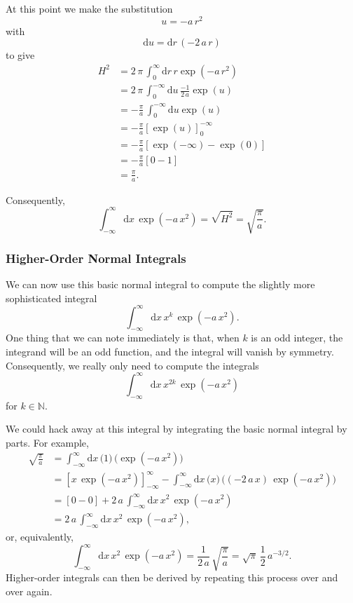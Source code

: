 \documentclass[
  letterpaper,
  DIV=11,
  numbers=noendperiod]{scrartcl}
\begin{document}
At this point we make the substitution \[
u = - a \, r^{2}
\] with \[
\mathrm{d} u = \mathrm{d} r \, (- 2 \, a \, r )
\] to give \begin{align*}
H^{2}
&=
2 \, \pi \, \int_{0}^{\infty} \mathrm{d} r \, r
\exp \left( -a \, r^{2} \right)
\\
&=
2 \, \pi \, \int_{0}^{-\infty} \mathrm{d} u \, \frac{-1}{2 \, a}
\exp \left( u \right)
\\
&=
- \frac{\pi}{a} \, \int_{0}^{-\infty} \mathrm{d} u \exp \left( u \right)
\\
&=
- \frac{\pi}{a} \left[ \exp \left( u \right) \right]_{0}^{-\infty}
\\
&=
- \frac{\pi}{a} \left[ \exp \left( -\infty \right) - \exp \left( 0 \right) \right]
\\
&=
- \frac{\pi}{a} \left[ 0 - 1 \right]
\\
&=
\frac{\pi}{a}.
\end{align*}

Consequently, \[
\int_{-\infty}^{\infty} \mathrm{d} x \,
\exp \left( -a \, x^{2} \right)
=
\sqrt{H^{2}}
=
\sqrt{ \frac{\pi}{a} }.
\]

\subsubsection{Higher-Order Normal
Integrals}\label{higher-order-normal-integrals}

We can now use this basic normal integral to compute the slightly more
sophisticated integral \[
\int_{-\infty}^{\infty} \mathrm{d} x \,
x^{k} \, \exp \left( -a \, x^{2} \right).
\] One thing that we can note immediately is that, when \(k\) is an odd
integer, the integrand will be an odd function, and the integral will
vanish by symmetry. Consequently, we really only need to compute the
integrals \[
\int_{-\infty}^{\infty} \mathrm{d} x \,
x^{2 k} \, \exp \left( -a \, x^{2} \right)
\] for \(k \in \mathbb{N}\).

We could hack away at this integral by integrating the basic normal
integral by parts. For example, \begin{align*}
\sqrt{ \frac{\pi}{a} }
&=
\int_{-\infty}^{\infty} \mathrm{d} x \,
\big( 1 \big) \,
\big( \exp \left( -a \, x^{2} \right) \big)
\\
&=
\left[
  x \, \exp \left( -a \, x^{2} \right)
\right]_{-\infty}^{\infty}
- \int_{-\infty}^{\infty} \mathrm{d} x \,
\big( x \big) \,
\big( (- 2 \, a \, x) \, \exp \left( -a \, x^{2} \right) \big)
\\
&=
\left[ 0 - 0 \right]
+ 2 \, a \, \int_{-\infty}^{\infty} \mathrm{d} x \,
x^{2} \, \exp \left( -a \, x^{2} \right)
\\
&=
2 \, a \, \int_{-\infty}^{\infty} \mathrm{d} x \,
x^{2} \, \exp \left( -a \, x^{2} \right),
\end{align*} or, equivalently, \[
\int_{-\infty}^{\infty} \mathrm{d} x \,
x^{2} \, \exp \left( -a \, x^{2} \right)
=
\frac{1}{2 \, a} \, \sqrt{ \frac{\pi}{a} }
=
\sqrt{\pi} \, \frac{1}{2} \, a^{-3/2}.
\] Higher-order integrals can then be derived by repeating this process
over and over again.
\end{document}
